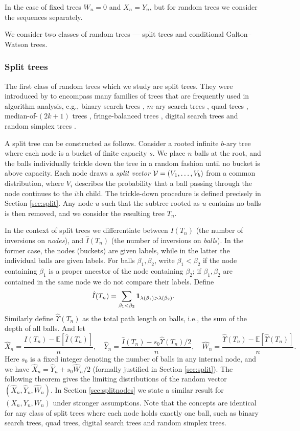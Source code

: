 \documentclass[11pt]{article}
\newcommand{\E}[1]{\mathbb{E} \left[#1\right]}
\newcommand{\ball}[1]{\hat{#1}}
\def\bI{\ball{I}}
\def\bX{\ball{X}}
\def\bY{\ball{Y}}
\def\bW{\ball{W}}
\def\bU{\ball{\Upsilon}}
\newcommand{\ind}{{\bf 1}}
\newcommand\cV{{\cal V}}
\def\XX{X}
\def\YY{Y}
\def\ZZ{W}
\def\b{\beta}
\def\l{\lambda}
\numberwithin{theorem}{section}
\theoremstyle{definition}
\numberwithin{equation}{section}
\begin{document}
In the case of fixed trees \(\ZZ_{n} = 0\) and $\XX_n = \YY_n$, but for
random trees we 
consider the sequences separately.

We consider two classes of random trees --- split trees and conditional
Galton--Watson trees.

\subsubsection*{Split trees}

The first class of random trees which we study are split trees. They were introduced
by \citet{MR1634354} to encompass many families of trees that are frequently used in
algorithm analysis, e.g., binary search trees \cite{MR0142216}, $m$-ary search trees
\cite{MR0216622}, quad trees \cite{Finkel1974}, median-of-\((2k+1)\) trees \cite{w76}, 
fringe-balanced trees \cite{MR1236537}, digital search trees \cite{Coffman:1970} and random simplex
trees \cite[Example 5]{MR1634354}.

A split tree can be constructed as follows. Consider a rooted infinite
$b$-ary tree 
where
each node is a bucket of finite capacity $s$. 
We place $n$ balls at the root, and the balls
individually trickle down the tree in a random fashion until no bucket is above capacity. Each node draws a {\em split vector} $\cV = (V_1,\dots,V_b)$ from a common distribution, where $V_i$ describes the probability that a ball passing through the node continues to the $i$th child.  The trickle-down procedure is defined precisely
in Section \ref{sec:split}. Any node $u$ such that the subtree rooted as $u$ contains no balls
is then removed, and we consider the resulting tree $T_n$.

In the context of split trees we differentiate between $I(T_n)$ (the number of inversions on {\em
    nodes}), and $\bI(T_n)$ (the number of inversions on {\em balls}). In the former case, the nodes
(buckets) are given labels, while in the latter the individual balls are given labels. For balls
$\b_1,\b_2$, write $\b_1 < \b_2$ if the node containing $\b_1$ is a proper ancestor of the node
containing $\b_2$; if $\b_1,\b_2$ are contained in the same node we do not compare their labels.
Define
$$
\bI(T_n) = \sum_{\b_1 < \b_2} {\ind}_{\l(\b_1) > \l(\b_2)}.
$$
Similarly define $\bU(T_n)$ as the total path length on balls,
i.e., the sum of the depth of all balls.
And let
\begin{equation}\label{eq:ballxyz}
\bX_n = \frac{\bI(T_n) - \E{\bI(T_n)}}{n}, \quad \bY_n = \frac{\bI(T_n) - s_0\bU(T_n)/2}{n}, \quad \bW_n = \frac{\bU(T_n) - \E{\bU(T_n)}}{n}.
\end{equation}
Here $s_0$ is a fixed integer denoting the number of balls in any internal node, and we have $\bX_n
= \bY_n + s_0\bW_n/2$ (formally justified in Section \ref{sec:split}). The following theorem gives
the limiting
distributions of the random vector $(\bX_n, \bY_n, \bW_n)$. In Section \ref{sec:splitnodes} we state a similar result for
$(\XX_n, \YY_n, \ZZ_n)$ under stronger assumptions. Note that the concepts are identical for any class
of split trees where each node holds exactly one ball, such as binary search trees, quad trees,
digital search trees and random simplex trees.
\end{document}

